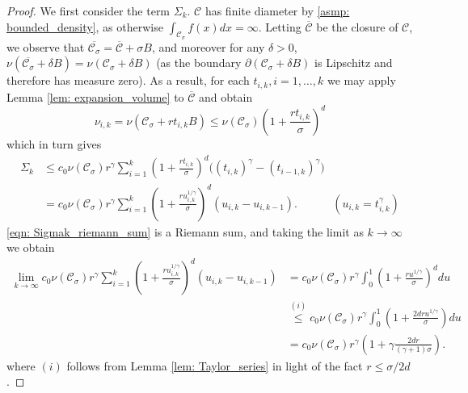 \documentclass{article}
\newcommand{\1}{\mathbf{1}}
\newcommand{\Cset}{\mathcal{C}}
\newcommand{\Csig}{\Cset_{\sigma}}
\theoremstyle{aldenthm}
\theoremstyle{aldenrmrk}
\begin{document}
\begin{proof}
	We first consider the term $\Sigma_k$. $\Cset$ has finite diameter by \ref{asmp: bounded_density}, as otherwise $\int_{\Csig} f(x) dx = \infty$. Letting $\overline{\Cset}$ be the closure of $\Cset$, we observe that $\overline{\Csig} = \overline{\Cset} + \sigma B$, and moreover for any $\delta > 0$, $\nu(\overline{\Csig} + \delta B) = \nu(\Csig + \delta B)$ (as the boundary $\partial(\Csig + \delta B)$ is Lipschitz and therefore has measure zero). As a result, for each $t_{i,k}, i = 1, \ldots,k$ we may apply Lemma \ref{lem: expansion_volume} to $\overline{\Cset}$ and obtain
	\begin{equation}
	\label{eqn: slice_volume_bound}
	\nu_{i,k} = \nu(\Csig + rt_{i,k}B) \leq \nu(\Csig)\left(1 + \frac{rt_{i,k}}{\sigma}\right)^d
	\end{equation}
	which in turn gives
	\begin{align}
	\Sigma_k & \leq c_0\nu(\Csig) r^\gamma \sum_{i = 1}^{k} \left(1 + \frac{ rt_{i,k}}{\sigma}\right)^d \biggl( (t_{i,k})^{\gamma} - (t_{i-1,k})^{\gamma}\biggr) \nonumber \\
	& = c_0\nu(\Csig) r^\gamma \sum_{i = 1}^{k} \left(1 + \frac{ru_{i,k}^{1/\gamma}}{\sigma}\right)^d ( u_{i,k} - u_{i,k-1}).~~~~~~~~~~~~~~ (u_{i,k} = t_{i,k}^{\gamma}) \label{eqn: Sigmak_riemann_sum}
	\end{align}
	\eqref{eqn: Sigmak_riemann_sum} is a Riemann sum, and taking the limit as $k \to \infty$ we obtain
	\begin{align}
	\lim_{k \to \infty} c_0\nu(\Csig) r^\gamma \sum_{i = 1}^{k} \left(1 + \frac{ru_{i,k}^{1/\gamma}}{\sigma}\right)^d ( u_{i,k} - u_{i,k-1}) & = c_0\nu(\Csig) r^\gamma \int_{0}^{1} \left(1 + \frac{r u^{1/\gamma}}{\sigma}\right)^{d} du \nonumber \\
	& \overset{(i)}{\leq} c_0\nu(\Csig) r^\gamma \int_{0}^{1} \left(1 + \frac{2 d r u^{1/\gamma}}{\sigma}\right) du \nonumber \\
	& = c_0\nu(\Csig) r^\gamma \left(1 + \gamma \frac{2 d r}{(\gamma + 1)\sigma}\right). \label{eqn: Sigmak_integral}
	\end{align}
	where $(i)$ follows from Lemma \ref{lem: Taylor_series} in light of the fact $r \leq \sigma / 2d$. 
	

\end{proof}
\end{document}

